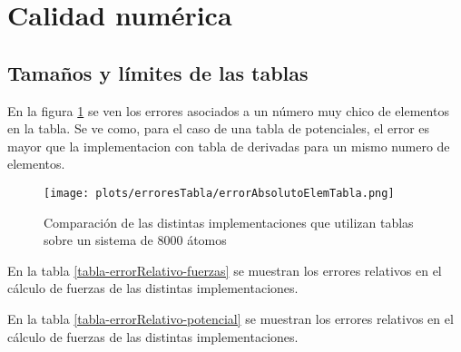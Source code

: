 \section{Calidad numérica}

\subsection{Tamaños y límites de las tablas}
En la figura \ref{errorAbsElemTabla} se ven los errores asociados a un número muy chico de elementos en la tabla. 
Se ve como, para el caso de una tabla de potenciales, el error es mayor que la implementacion con tabla de derivadas
para un mismo numero de elementos.

\begin{figure}[htbp]
\centering
   \texttt{[image: plots/erroresTabla/errorAbsolutoElemTabla.png]}
 \caption{Comparaci\'on de las distintas implementaciones que utilizan tablas sobre un sistema de 8000 átomos }
 \label{errorAbsElemTabla}
\end{figure}





En la tabla \ref{tabla-errorRelativo-fuerzas} se muestran los errores relativos en el cálculo de fuerzas de las distintas implementaciones.



En la tabla \ref{tabla-errorRelativo-potencial} se muestran los errores relativos en el cálculo de fuerzas de las distintas implementaciones.





